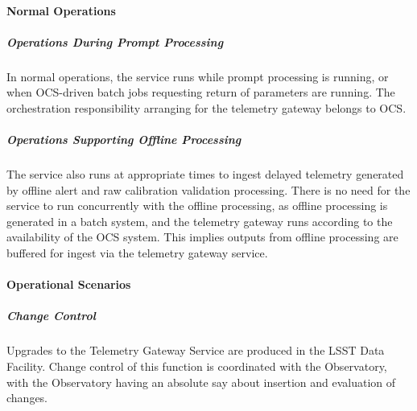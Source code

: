 \paragraph{Normal Operations}

\subparagraph{Operations During Prompt Processing}

In normal operations, the service runs while prompt processing is running,
or when OCS-driven batch jobs requesting return of parameters are running.
The orchestration responsibility arranging for the telemetry gateway belongs to OCS.

\subparagraph{Operations Supporting Offline Processing}
The service also runs at appropriate times to ingest delayed telemetry
generated by offline alert  and raw calibration validation processing. There is no need for the service
to run concurrently with the offline processing, as offline processing is
generated in a batch system, and the telemetry gateway runs according to
the availability of the OCS system. This implies outputs from offline processing
are buffered for ingest via the telemetry gateway service.

\paragraph{Operational Scenarios}

\subparagraph{Change Control}

Upgrades to the Telemetry Gateway Service are produced in the LSST Data Facility.
Change control of this function is coordinated with the Observatory, with the
Observatory having an absolute say about insertion and evaluation of changes.
